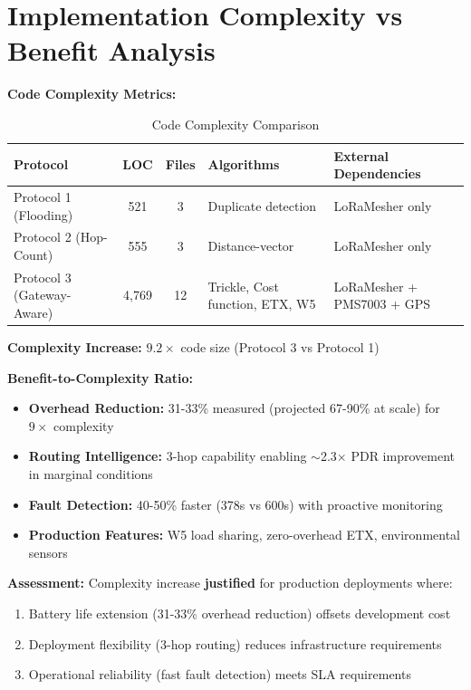\section{Implementation Complexity vs Benefit Analysis}

\textbf{Code Complexity Metrics:}

\begin{table}[h]
\centering
\caption{Code Complexity Comparison}
\label{tab:code-complexity}
\begin{tabular}{p{4cm}ccp{3.5cm}p{4cm}}
\hline
\textbf{Protocol} & \textbf{LOC} & \textbf{Files} & \textbf{Algorithms} & \textbf{External Dependencies} \\
\hline
Protocol 1 (Flooding) & 521 & 3 & Duplicate detection & LoRaMesher only \\
\hline
Protocol 2 (Hop-Count) & 555 & 3 & Distance-vector & LoRaMesher only \\
\hline
Protocol 3 (Gateway-Aware) & 4,769 & 12 & Trickle, Cost function, ETX, W5 & LoRaMesher + PMS7003 + GPS \\
\hline
\end{tabular}
\end{table}

\textbf{Complexity Increase:} $9.2\times$ code size (Protocol 3 vs Protocol 1)

\textbf{Benefit-to-Complexity Ratio:}
\begin{itemize}
\item \textbf{Overhead Reduction:} 31-33\% measured (projected 67-90\% at scale) for $9\times$ complexity
\item \textbf{Routing Intelligence:} 3-hop capability enabling $\sim$2.3$\times$ PDR improvement in marginal conditions
\item \textbf{Fault Detection:} 40-50\% faster (378s vs 600s) with proactive monitoring
\item \textbf{Production Features:} W5 load sharing, zero-overhead ETX, environmental sensors
\end{itemize}

\textbf{Assessment:} Complexity increase \textbf{justified} for production deployments where:
\begin{enumerate}
\item Battery life extension (31-33\% overhead reduction) offsets development cost
\item Deployment flexibility (3-hop routing) reduces infrastructure requirements
\item Operational reliability (fast fault detection) meets SLA requirements
\end{enumerate}

